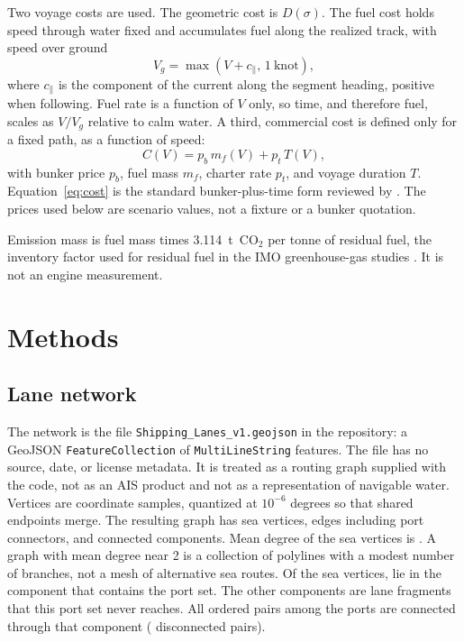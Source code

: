 \documentclass[11pt]{article}
\begin{document}
Two voyage costs are used.
The geometric cost is \(D(\sigma)\).
The fuel cost holds speed through water fixed and accumulates fuel along the realized track, with speed over ground
\begin{equation}
V_g = \max(V + c_{\parallel},\, 1~\mathrm{knot}),
\label{eq:sog}
\end{equation}
where \(c_{\parallel}\) is the component of the current along the segment heading, positive when following.
Fuel rate is a function of \(V\) only, so time, and therefore fuel, scales as \(V/V_g\) relative to calm water.
A third, commercial cost is defined only for a fixed path, as a function of speed:
\begin{equation}
C(V) = p_b\, m_f(V) + p_t\, T(V),
\label{eq:cost}
\end{equation}
with bunker price \(p_b\), fuel mass \(m_f\), charter rate \(p_t\), and voyage duration \(T\).
Equation~\eqref{eq:cost} is the standard bunker-plus-time form reviewed by \citet{psaraftis2013}.
The prices used below are scenario values, not a fixture or a bunker quotation.

Emission mass is fuel mass times 3.114~t~CO\(_2\) per tonne of residual fuel, the inventory factor used for residual fuel in the IMO greenhouse-gas studies \citep{imo2020}.
It is not an engine measurement.

\section{Methods}
\label{sec:methods}

\subsection{Lane network}
The network is the file \texttt{Shipping\_Lanes\_v1.geojson} in the repository: a GeoJSON \texttt{FeatureCollection} of \texttt{MultiLineString} features.
The file has no source, date, or license metadata.
It is treated as a routing graph supplied with the code, not as an AIS product and not as a representation of navigable water.
Vertices are coordinate samples, quantized at \(10^{-6}\) degrees so that shared endpoints merge.
The resulting graph has \NSeaNodes{} sea vertices, \NEdges{} edges including port connectors, and \NComponents{} connected components.
Mean degree of the sea vertices is \MeanDegree.
A graph with mean degree near 2 is a collection of polylines with a modest number of branches, not a mesh of alternative sea routes.
Of the sea vertices, \SeaInPortComponent{} lie in the component that contains the port set.
The other components are lane fragments that this port set never reaches.
All \NPairs{} ordered pairs among the \NPorts{} ports are connected through that component (\NDisconnected{} disconnected pairs).
\end{document}
